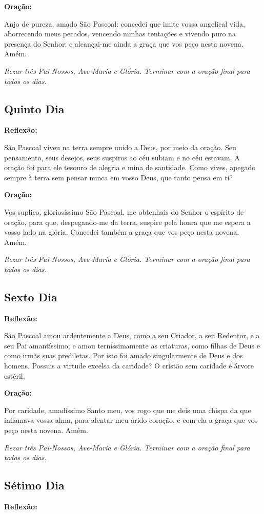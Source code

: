 \documentclass[18pt]{article}
\begin{document}
\textbf{Oração:}

Anjo de pureza, amado São Pascoal: concedei que imite vossa angelical vida, aborrecendo meus pecados, vencendo minhas tentações e vivendo puro na presença do Senhor; e alcançai-me ainda a graça que vos peço nesta novena. Amém.

\textit{Rezar três Pai-Nossos, Ave-Maria e Glória. Terminar com a oração final para todos os dias.}

\subsection*{Quinto Dia}
\textbf{Reflexão:}

São Pascoal viveu na terra sempre unido a Deus, por meio da oração. Seu pensamento, seus desejos, seus suspiros ao céu subiam e no céu estavam. A oração foi para ele tesouro de alegria e mina de santidade. Como vives, apegado sempre à terra sem pensar nunca em vosso Deus, que tanto pensa em ti?

\textbf{Oração:}

Vos suplico, gloriosíssimo São Pascoal, me obtenhais do Senhor o espírito de oração, para que, despegando-me da terra, suspire pela honra que me espera a vosso lado na glória. Concedei também a graça que vos peço nesta novena. Amém.

\textit{Rezar três Pai-Nossos, Ave-Maria e Glória. Terminar com a oração final para todos os dias.}

\subsection*{Sexto Dia}
\textbf{Reflexão:}

São Pascoal amou ardentemente a Deus, como a seu Criador, a seu Redentor, e a seu Pai amantíssimo; e amou terníssimamente as criaturas, como filhas de Deus e como irmãs suas prediletas. Por isto foi amado singularmente de Deus e dos homens. Possuis a virtude excelsa da caridade? O cristão sem caridade é árvore estéril.

\textbf{Oração:}

Por caridade, amadíssimo Santo meu, vos rogo que me deis uma chispa da que inflamava vossa alma, para alentar meu árido coração, e com ela a graça que vos peço nesta novena. Amém.

\textit{Rezar três Pai-Nossos, Ave-Maria e Glória. Terminar com a oração final para todos os dias.}

\subsection*{Sétimo Dia}
\textbf{Reflexão:}
\end{document}
